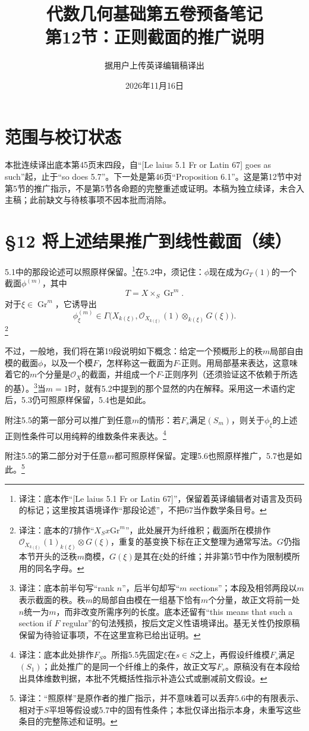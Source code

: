 \documentclass[openany,fontset=fandol]{ctexbook}
\newcommand{\note}[1]{\footnote{译注：#1}}
\begin{document}
\title{代数几何基础第五卷预备笔记\\第12节：正则截面的推广说明}
\author{据用户上传英译编辑稿译出}
\date{2026年11月16日}
\maketitle
\chapter*{范围与校订状态}
本批连续译出底本第45页末四段，自“[Le laius 5.1 Fr or Latin 67] goes as such”起，止于“so does 5.7”。下一处是第46页“Proposition 6.1”。这是第12节中对第5节的推广指示，不是第5节各命题的完整重述或证明。本稿为独立续译，未合入主稿；此前缺文与待核事项不因本批而消除。
\chapter*{§12 将上述结果推广到线性截面（续）}
5.1中的那段论述可以照原样保留。\note{底本作“[Le laius 5.1 Fr or Latin 67]”，保留着英译编辑者对语言及页码的标记；这里按其语境译作“那段论述”，不把67当作数学条目号。}在5.2中，须记住：$\phi$现在成为$G_T(1)$的一个截面$\phi^{(m)}$，其中
\[
T=X\times_S\operatorname{Gr}^{m}.
\]
对于$\xi\in\operatorname{Gr}^{m}$，它诱导出
\[
\phi^{(m)}_{\xi}\in
\Gamma\bigl(X_{k(\xi)},\mathcal O_{X_{k(\xi)}}(1)\otimes_{k(\xi)}G(\xi)\bigr).
\]
\note{底本的$T$排作“$X_Sx\mathrm{Gr}^m$”，此处展开为纤维积；截面所在模排作$\mathcal O_{X_{k(\xi)}}(1)_{k(\xi)}\otimes G(\xi)$，重复的基变换下标在正文整理为通常写法。$G$仍指本节开头的泛秩$m$商模，$G(\xi)$是其在$\xi$处的纤维；并非第5节中作为限制模所用的同名字母。}

不过，一般地，我们将在第19段说明如下概念：给定一个预概形上的秩$m$局部自由模的截面$\phi$，以及一个模$F$，怎样称这一截面为$F$-正则。用局部基来表达，这意味着它的$m$个分量是$\mathcal O_X$的截面，并组成一个$F$-正则序列（还须验证这不依赖于所选的基）。\note{底本前半句写“rank $n$”，后半句却写“$m$ sections”；本段及相邻两段以$m$表示截面的秩。秩$m$的局部自由模在一组基下恰有$m$个分量，故正文将前一处$n$统一为$m$，而非改变所需序列的长度。底本还留有“this means that such a section if $F$ regular”的句法残损，按后文定义性语境译出。基无关性仍按原稿保留为待验证事项，不在这里宣称已给出证明。}当$m=1$时，就有5.2中提到的那个显然的内在解释。采用这一术语约定后，5.3仍可照原样保留，5.4也是如此。

\newpage
附注5.5的第一部分可以推广到任意$m$的情形：若$F_s$满足$(S_m)$，则关于$\phi_\xi$的上述正则性条件可以用纯粹的维数条件来表达。\note{底本此处排作$F_S$。所指5.5先固定$\xi$在$s\in S$之上，再假设纤维模$F_s$满足$(S_1)$；此处推广的是同一个纤维上的条件，故正文写$F_s$。原稿没有在本段给出具体维数判据，本批不凭概括性指示补造公式或删减前文假设。}

附注5.5的第二部分对于任意$m$都可照原样保留。定理5.6也照原样推广，5.7也是如此。\note{“照原样”是原作者的推广指示，并不意味着可以丢弃5.6中的有限表示、相对于$S$平坦等假设或5.7中的固有性条件；本批仅译出指示本身，未重写这些条目的完整陈述和证明。}
\end{document}
